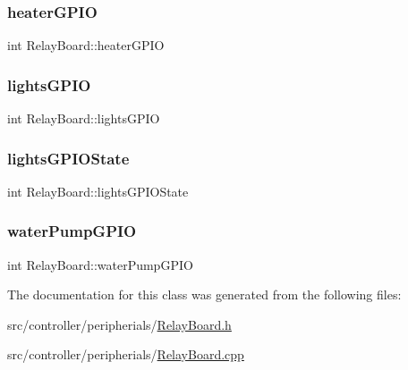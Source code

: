 \subsubsection{\texorpdfstring{heater\+G\+P\+IO}{heaterGPIO}}
{\footnotesize\ttfamily int Relay\+Board\+::heater\+G\+P\+IO\hspace{0.3cm}{\ttfamily [private]}}

\mbox{\label{classRelayBoard_a05f68a6555288127a238e31282886ae0}} 
\subsubsection{\texorpdfstring{lights\+G\+P\+IO}{lightsGPIO}}
{\footnotesize\ttfamily int Relay\+Board\+::lights\+G\+P\+IO\hspace{0.3cm}{\ttfamily [private]}}

\mbox{\label{classRelayBoard_a0b33569569f2698b99a17e65f6dbc5a1}} 
\subsubsection{\texorpdfstring{lights\+G\+P\+I\+O\+State}{lightsGPIOState}}
{\footnotesize\ttfamily int Relay\+Board\+::lights\+G\+P\+I\+O\+State\hspace{0.3cm}{\ttfamily [private]}}

\mbox{\label{classRelayBoard_a195c50d455165712f59cd39c6f7a6b82}} 
\subsubsection{\texorpdfstring{water\+Pump\+G\+P\+IO}{waterPumpGPIO}}
{\footnotesize\ttfamily int Relay\+Board\+::water\+Pump\+G\+P\+IO\hspace{0.3cm}{\ttfamily [private]}}



The documentation for this class was generated from the following files\+:\begin{DoxyCompactItemize}
\item 
src/controller/peripherials/\hyperlink{RelayBoard_8h}{Relay\+Board.\+h}\item 
src/controller/peripherials/\hyperlink{RelayBoard_8cpp}{Relay\+Board.\+cpp}\end{DoxyCompactItemize}
